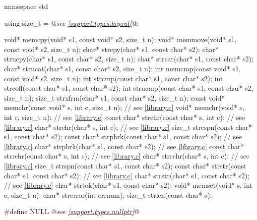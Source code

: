 %
%
%
%
%
%
%
%
%
%
%
%
%
%
%
%
%
%
%
%
%
%
%
%
\begin{codeblock}
namespace std {
  using size_t = @\textit{see \ref{support.types.layout}}@;

  void* memcpy(void* s1, const void* s2, size_t n);
  void* memmove(void* s1, const void* s2, size_t n);
  char* strcpy(char* s1, const char* s2);
  char* strncpy(char* s1, const char* s2, size_t n);
  char* strcat(char* s1, const char* s2);
  char* strncat(char* s1, const char* s2, size_t n);
  int memcmp(const void* s1, const void* s2, size_t n);
  int strcmp(const char* s1, const char* s2);
  int strcoll(const char* s1, const char* s2);
  int strncmp(const char* s1, const char* s2, size_t n);
  size_t strxfrm(char* s1, const char* s2, size_t n);
  const void* memchr(const void* s, int c, size_t n);  // see \ref{library.c}
  void* memchr(void* s, int c, size_t n);  // see \ref{library.c}
  const char* strchr(const char* s, int c);  // see \ref{library.c}
  char* strchr(char* s, int c);  // see \ref{library.c}
  size_t strcspn(const char* s1, const char* s2);
  const char* strpbrk(const char* s1, const char* s2);  // see \ref{library.c}
  char* strpbrk(char* s1, const char* s2);  // see \ref{library.c}
  const char* strrchr(const char* s, int c);  // see \ref{library.c}
  char* strrchr(char* s, int c);  // see \ref{library.c}
  size_t strspn(const char* s1, const char* s2);
  const char* strstr(const char* s1, const char* s2);  // see \ref{library.c}
  char* strstr(char* s1, const char* s2);  // see \ref{library.c}
  char* strtok(char* s1, const char* s2);
  void* memset(void* s, int c, size_t n);
  char* strerror(int errnum);
  size_t strlen(const char* s);
}

#define NULL @\textit{see \ref{support.types.nullptr}}@
\end{codeblock}

